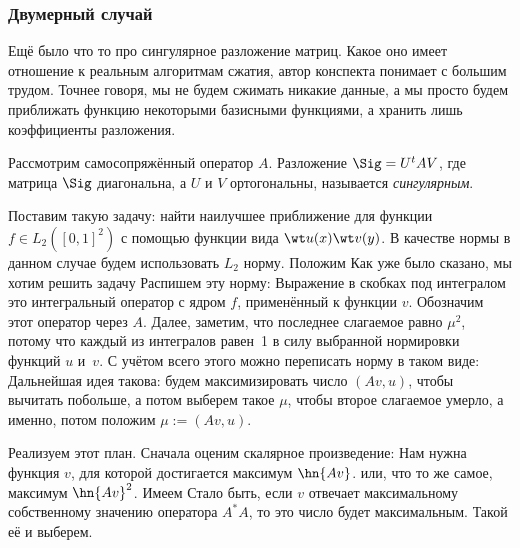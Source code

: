 \documentclass[a4paper]{article}
\begin{document}
\subsubsection{Двумерный случай}

Ещё было что то про сингулярное разложение матриц. Какое оно имеет
отношение к реальным алгоритмам сжатия, автор конспекта понимает с
большим трудом. Точнее говоря, мы не будем сжимать никакие данные, а
мы просто будем приближать функцию некоторыми базисными функциями, а
хранить лишь коэффициенты разложения.

\begin{df}
Рассмотрим самосопряжённый оператор $A$. Разложение $\Sig = U^tAV$,
где матрица $\Sig$ диагональна, а $U$ и $V$ ортогональны, называется
\emph{сингулярным}.
\end{df}

Поставим такую задачу: найти наилучшее приближение для функции $f \in
L_2([0,1]^2)$ с помощью функции вида $\wt u(x)\wt v(y)$.  В качестве
нормы в данном случае будем использовать $L_2$ норму.  Положим   Как уже было сказано, мы хотим решить задачу   Распишем эту норму:   Выражение в скобках под
интегралом это интегральный оператор с ядром $f$, применённый к
функции $v$.  Обозначим этот оператор через $A$. Далее, заметим, что
последнее слагаемое равно $\mu^2$, потому что каждый из интегралов
равен~1 в силу выбранной нормировки функций $u$ и~$v$.  С учётом всего
этого можно переписать норму в таком виде:   Дальнейшая
идея такова: будем максимизировать число $(Av,u)$, чтобы вычитать
побольше, а потом выберем такое $\mu$, чтобы второе слагаемое умерло,
а именно, потом положим $\mu := (Av,u)$.

Реализуем этот план. Сначала оценим скалярное произведение:
  Нам нужна
функция $v$, для которой достигается максимум $\hn{A v}$.  или, что то
же самое, максимум $\hn{A v}^2$.  Имеем   Стало быть, если $v$ отвечает максимальному
собственному значению оператора $A^*A$, то это число будет
максимальным. Такой её и выберем.
\end{document}
